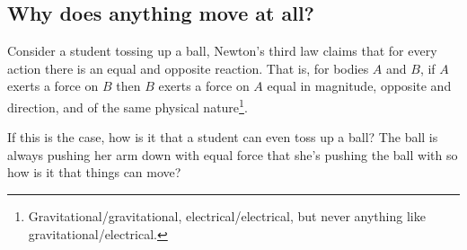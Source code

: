 \subsection{Why does anything move at all?}
Consider a student tossing up a ball, Newton's third law claims that for every action there is an equal and opposite reaction. That is, for bodies $A$ and $B$, if $A$ exerts a force on $B$ then $B$ exerts a force on $A$ equal in magnitude, opposite and direction, and of the same physical nature\footnote{Gravitational/gravitational, electrical/electrical, but never anything like gravitational/electrical.}. 

If this is the case, how is it that a student can even toss up a ball? The ball is always pushing her arm down with equal force that she's pushing the ball with so how is it that things can move?
\hspace*{15pt}{\scriptsize Credit: E. Mendez}